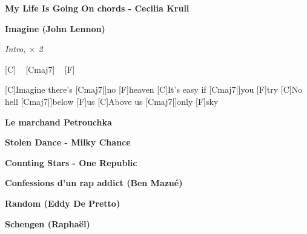 \documentclass{guitartabs}
\begin{document}
\begin{guitar}
\textbf{My Life Is Going On chords - Cecilia Krull }

\end{guitar}



\begin{guitar}

\textbf{Imagine (John Lennon)}

\emph{Intro, $\times$ 2}%

[C] ~ [Cmaj7]  ~ [F]  ~  %

[C]Imagine there's [Cmaj7|]{no} [F]heaven
[C]It's easy if [Cmaj7|]{you} [F]try
[C]No hell [Cmaj7|]{below} [F]us
[C]Above us [Cmaj7|]{only} [F]sky
\end{guitar}


\begin{guitar}
\textbf{Le marchand Petrouchka}

\end{guitar}



\begin{guitar}
\textbf{Stolen Dance - Milky Chance}

\end{guitar}

\begin{guitar}
\textbf{Counting Stars - One Republic}

\end{guitar}


\begin{guitar}
\textbf{Confessions d'un rap addict (Ben Mazué)}

\end{guitar}

\begin{guitar}
\textbf{Random (Eddy De Pretto)}

\end{guitar}


\begin{guitar}
\textbf{Schengen (Raphaël)}

\end{guitar}
\end{document}
